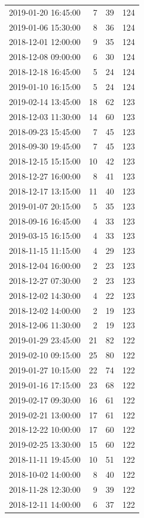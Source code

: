 \begin{tabular}{lrrr}
2019-01-20 16:45:00 & 7 & 39 & 124 \\
2019-01-06 15:30:00 & 8 & 36 & 124 \\
2018-12-01 12:00:00 & 9 & 35 & 124 \\
2018-12-08 09:00:00 & 6 & 30 & 124 \\
2018-12-18 16:45:00 & 5 & 24 & 124 \\
2019-01-10 16:15:00 & 5 & 24 & 124 \\
2019-02-14 13:45:00 & 18 & 62 & 123 \\
2018-12-03 11:30:00 & 14 & 60 & 123 \\
2018-09-23 15:45:00 & 7 & 45 & 123 \\
2018-09-30 19:45:00 & 7 & 45 & 123 \\
2018-12-15 15:15:00 & 10 & 42 & 123 \\
2018-12-27 16:00:00 & 8 & 41 & 123 \\
2018-12-17 13:15:00 & 11 & 40 & 123 \\
2019-01-07 20:15:00 & 5 & 35 & 123 \\
2018-09-16 16:45:00 & 4 & 33 & 123 \\
2019-03-15 16:15:00 & 4 & 33 & 123 \\
2018-11-15 11:15:00 & 4 & 29 & 123 \\
2018-12-04 16:00:00 & 2 & 23 & 123 \\
2018-12-27 07:30:00 & 2 & 23 & 123 \\
2018-12-02 14:30:00 & 4 & 22 & 123 \\
2018-12-02 14:00:00 & 2 & 19 & 123 \\
2018-12-06 11:30:00 & 2 & 19 & 123 \\
2019-01-29 23:45:00 & 21 & 82 & 122 \\
2019-02-10 09:15:00 & 25 & 80 & 122 \\
2019-01-27 10:15:00 & 22 & 74 & 122 \\
2019-01-16 17:15:00 & 23 & 68 & 122 \\
2019-02-17 09:30:00 & 16 & 61 & 122 \\
2019-02-21 13:00:00 & 17 & 61 & 122 \\
2018-12-22 10:00:00 & 17 & 60 & 122 \\
2019-02-25 13:30:00 & 15 & 60 & 122 \\
2018-11-11 19:45:00 & 10 & 51 & 122 \\
2018-10-02 14:00:00 & 8 & 40 & 122 \\
2018-11-28 12:30:00 & 9 & 39 & 122 \\
2018-12-11 14:00:00 & 6 & 37 & 122 \\

\end{tabular}
